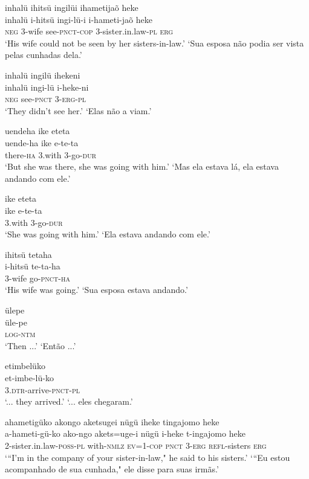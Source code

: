 \documentclass[output=paper,
modfonts,nonflat
]{langsci/langscibook}
\begin{document}
\ea  inhalü ihitsü ingilüi ihametijaõ heke\\[.3em]
\gll inhalü i-hitsü ingi-lü-i i-hameti-jaõ heke\\
     \textsc{neg} 3-wife see-\textsc{pnct}-\textsc{cop} 3-sister.in.law-\textsc{pl} \textsc{erg}\\
\glt ‘His wife could not be seen by her sisters-in-law.’
\glt ‘Sua esposa não podia ser vista pelas cunhadas dela.’
\z

\ea  inhalü ingilü ihekeni\\[.3em]
\gll inhalü ingi-lü i-heke-ni\\
     \textsc{neg} see-\textsc{pnct} 3-\textsc{erg}-\textsc{pl}\\
\glt ‘They didn't see her.’
\glt ‘Elas não a viam.’
\z

\ea  uendeha ike eteta\\[.3em]
\gll uende-ha ike e-te-ta\\
     there-\textsc{ha} 3.with 3-go-\textsc{dur}\\
\glt ‘But she was there, she was going with him.’
\glt ‘Mas ela estava lá, ela estava andando com ele.’
\z

\ea  ike eteta\\[.3em]
\gll ike e-te-ta\\
     3.with 3-go-\textsc{dur}\\
\glt ‘She was going with him.’
\glt ‘Ela estava andando com ele.’
\z

\ea  ihitsü tetaha\\[.3em]
\gll i-hitsü te-ta-ha\\
     3-wife go-\textsc{pnct}-\textsc{ha}\\
\glt ‘His wife was going.’
\glt ‘Sua esposa estava andando.’
\z

\ea  ülepe\\[.3em]
\gll üle-pe\\
     \textsc{log}-\textsc{ntm}\\
\glt ‘Then ...’
\glt ‘Então ...’
\z

\ea  etimbelüko\\[.3em]
\gll et-imbe-lü-ko\\
     \textsc{3.dtr}-arrive-\textsc{pnct}-\textsc{pl}\\
\glt ‘... they arrived.’
\glt ‘... eles chegaram.’
\z

\ea  ahametigüko akongo aketsugei nügü iheke tingajomo heke\\[.3em]
\gll a-hameti-gü-ko ako-ngo akets=uge-i nügü i-heke t-ingajomo heke\\
     2-sister.in.law-\textsc{poss}-\textsc{pl} with-\textsc{nmlz} \textsc{ev}=\textsc{1}-\textsc{cop} \textsc{pnct} 3-\textsc{erg} \textsc{refl}-sisters \textsc{erg}\\
\glt ‘“I'm in the company of your sister-in-law," he said to his sisters.’
\glt ‘“Eu estou acompanhado de sua cunhada," ele disse para suas irmãs.’
\z
\end{document}
